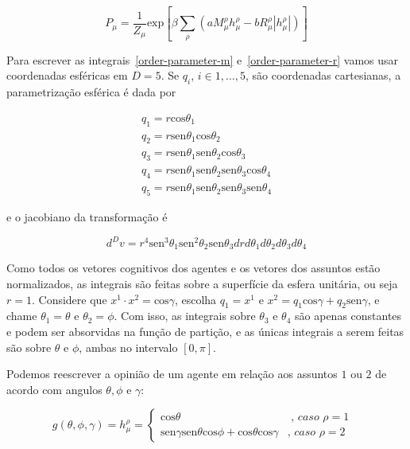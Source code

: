 \documentclass[a4paper, 11pt]{article} %
\newcommand{\Mh}[1]{\ensuremath{\displaystyle%
    M^{\rho}_{#1}}}
\newcommand{\Rh}[1]{\ensuremath{\displaystyle%
    R^{\rho}_{#1}}}
\newcommand{\inp}[1]{\ensuremath{\displaystyle%
    \left(#1\right)}}
\newcommand{\ins}[1]{\ensuremath{\displaystyle%
    \left[#1\right]}}
\begin{document}
\newcommand{\hf}[2]{%
    h_{#1}^{#2}}

\begin{equation} 
    P_{\mu} = \frac{1}{Z_{\mu}} \mathrm{exp} \ins{%
    \beta \sum_{\rho} \inp{a\Mh{\mu}\hf{\mu}{\rho} - b\Rh{\mu}|\hf{\mu}{\rho}|}}
\end{equation}

Para escrever as integrais~\ref{order-parameter-m} e~\ref{order-parameter-r}
vamos usar coordenadas esféricas em $D=5$. Se $q_{i}$, $i \in {1,\ldots,5}$, 
são coordenadas cartesianas, a parametrização esférica é dada por 

\newcommand{\cos}{\mathrm{cos}}
\newcommand{\sen}{\mathrm{sen}}

\begin{equation*}
    \begin{align}
        q_1 = r \cos \theta _1 \\
        q_2 = r \sen \theta _1 \cos \theta _2 \\
        q_3 = r \sen \theta _1 \sen \theta _2 \cos \theta _3 \\
        q_4 = r \sen \theta _1 \sen \theta _2 \sen \theta _3 \cos \theta _4 \\
        q_5 = r \sen \theta _1 \sen \theta _2 \sen \theta _3 \sen \theta _4
    \end{align}
\end{equation*}

e o jacobiano da transformação é 

\begin{equation*}
    d^D v = r^4 \sen ^3 \theta _1 \sen ^2 \theta _2 \sen \theta _3 
    drd\theta_1d\theta_2d\theta_3d\theta_4
\end{equation*}

Como todos os vetores cognitivos dos agentes e os vetores dos assuntos estão
normalizados, as integrais são feitas sobre a superfície da esfera unitária, ou
seja $r=1$. Considere que $x^1 \cdot x^2 = \cos \gamma$, escolha $q_1 =
x^1$ e $ x^2 = q_1\cos \gamma  + q_2\sen \gamma $, e chame $\theta_1 = \theta$ e
$\theta_2 = \phi$. Com isso, as integrais sobre $\theta_3$ e $\theta_4$ são
apenas constantes e podem ser absorvidas na função de partição, e as únicas
integrais a serem feitas são sobre $\theta$ e $\phi$, ambas no intervalo
$[0,\pi]$. 

Podemos reescrever a opinião de um agente em relação aos assuntos $1$ ou $2$ de
acordo com angulos $\theta,\phi$ e $\gamma$:

\[
    g\inp{\theta,\phi,\gamma} = \hf{\mu}{\rho} = 
    \begin{cases} 
        \cos \theta & \textit{ , caso $\rho=1$ } \\
        \sen \gamma \sen \theta \cos \phi + \cos \theta \cos \gamma &
        \textit{, caso $\rho=2$}
    \end{cases}
\]
\end{document}
